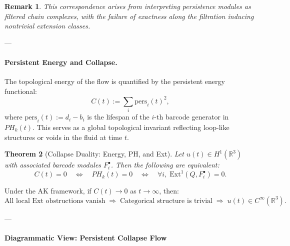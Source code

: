 \documentclass[11pt]{article}
\newtheorem{theorem}{Theorem}[section]
\newtheorem{remark}[theorem]{Remark}
\begin{document}
\begin{remark}
This correspondence arises from interpreting persistence modules as filtered chain complexes,  
with the failure of exactness along the filtration inducing nontrivial extension classes.
\end{remark}

---

\paragraph{Persistent Energy and Collapse.}

The topological energy of the flow is quantified by the persistent energy functional:
\[
C(t) := \sum_{i} \mathrm{pers}_i(t)^2,
\]
where \( \mathrm{pers}_i(t) := d_i - b_i \) is the lifespan of the \( i \)-th barcode generator in \( PH_k(t) \).  
This serves as a global topological invariant reflecting loop-like structures or voids in the fluid at time \( t \).

\begin{theorem}[Collapse Duality: Energy, PH, and Ext]
Let \( u(t) \in H^1(\mathbb{R}^3) \) with associated barcode modules \( F^\bullet_i \). Then the following are equivalent:
\[
C(t) = 0 
\quad \Longleftrightarrow \quad 
PH_k(t) = 0 
\quad \Longleftrightarrow \quad 
\forall i,\; \mathrm{Ext}^1(Q, F^\bullet_i) = 0.
\]
\end{theorem}

\begin{corollary}
Under the AK framework, if \( C(t) \to 0 \) as \( t \to \infty \), then:
\[
\text{All local Ext obstructions vanish} 
\;\Rightarrow\; 
\text{Categorical structure is trivial} 
\;\Rightarrow\; 
u(t) \in C^\infty(\mathbb{R}^3).
\]
\end{corollary}

---

\paragraph{Diagrammatic View: Persistent Collapse Flow}

\begin{center}
\end{center}
\end{document}
